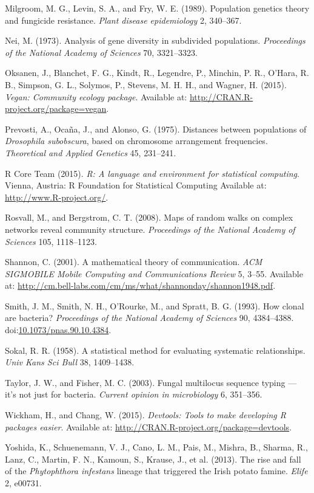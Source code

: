 \documentclass{frontiersSCNS} %
\begin{document}
Milgroom, M. G., Levin, S. A., and Fry, W. E. (1989). Population
genetics theory and fungicide resistance. \emph{Plant disease
epidemiology} 2, 340--367.

Nei, M. (1973). Analysis of gene diversity in subdivided populations.
\emph{Proceedings of the National Academy of Sciences} 70, 3321--3323.

Oksanen, J., Blanchet, F. G., Kindt, R., Legendre, P., Minchin, P. R.,
O'Hara, R. B., Simpson, G. L., Solymos, P., Stevens, M. H. H., and
Wagner, H. (2015). \emph{Vegan: Community ecology package}. Available
at: \url{http://CRAN.R-project.org/package=vegan}.

Prevosti, A., Oca{\~{n}}a, J., and Alonso, G. (1975). Distances between
populations of \emph{Drosophila subobscura}, based on chromosome
arrangement frequencies. \emph{Theoretical and Applied Genetics} 45,
231--241.

R Core Team (2015). \emph{R: A language and environment for statistical
computing}. Vienna, Austria: R Foundation for Statistical Computing
Available at: \url{http://www.R-project.org/}.

Rosvall, M., and Bergstrom, C. T. (2008). Maps of random walks on
complex networks reveal community structure. \emph{Proceedings of the
National Academy of Sciences} 105, 1118--1123.

Shannon, C. (2001). A mathematical theory of communication. \emph{ACM
SIGMOBILE Mobile Computing and Communications Review} 5, 3--55.
Available at:
\url{http://cm.bell-labs.com/cm/ms/what/shannonday/shannon1948.pdf}.

Smith, J. M., Smith, N. H., O'Rourke, M., and Spratt, B. G. (1993). How
clonal are bacteria? \emph{Proceedings of the National Academy of
Sciences} 90, 4384--4388.
doi:\href{http://dx.doi.org/10.1073/pnas.90.10.4384}{10.1073/pnas.90.10.4384}.

Sokal, R. R. (1958). A statistical method for evaluating systematic
relationships. \emph{Univ Kans Sci Bull} 38, 1409--1438.

Taylor, J. W., and Fisher, M. C. (2003). Fungal multilocus sequence
typing --- it's not just for bacteria. \emph{Current opinion in
microbiology} 6, 351--356.

Wickham, H., and Chang, W. (2015). \emph{Devtools: Tools to make
developing R packages easier}. Available at:
\url{http://CRAN.R-project.org/package=devtools}.

Yoshida, K., Schuenemann, V. J., Cano, L. M., Pais, M., Mishra, B.,
Sharma, R., Lanz, C., Martin, F. N., Kamoun, S., Krause, J., et al.
(2013). The rise and fall of the \emph{Phytophthora infestans} lineage
that triggered the Irish potato famine. \emph{Elife} 2, e00731.
\end{document}
